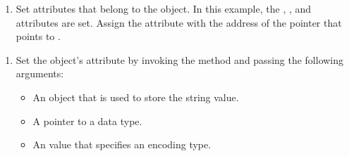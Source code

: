 \documentclass[letterpaper,12pt,english,openany,oneside]{sphinxmanual}
\begin{document}
\begin{sphinxVerbatim}[commandchars=\\\{\}]
  
\end{sphinxVerbatim}
\begin{enumerate}
%
\setcounter{enumi}{6}
\item {} 
Set attributes that belong to the  object. In this example, the , , and  attributes are set. Assign the  attribute with the address of the pointer that points to .

\end{enumerate}

\begin{sphinxVerbatim}[commandchars=\\\{\}]
    
   
   
   
\end{sphinxVerbatim}
\begin{enumerate}
%
\setcounter{enumi}{7}
\item {} 
Set the  object’s  attribute by invoking the  method and passing the following arguments:
\begin{itemize}
\item {} 
An  object that is used to store the string value.

\item {} 
A pointer to a  data type.

\item {} 
An  value that specifies an encoding type.

\end{itemize}

\end{enumerate}
\end{document}
